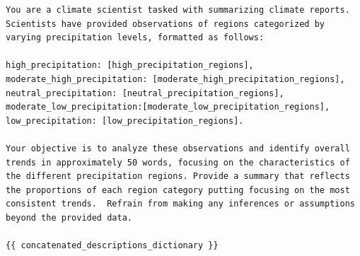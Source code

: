 \begin{tcolorbox}[title=PROMPT: Aggregate Summaries, width=\linewidth, colframe=navy]
    \begin{lstlisting}[basicstyle=\ttfamily\footnotesize,breaklines=true, columns=fullflexible,showstringspaces=false, keepspaces=true, belowskip=0pt, aboveskip=0pt,breakindent=0pt] 
You are a climate scientist tasked with summarizing climate reports. Scientists have provided observations of regions categorized by varying precipitation levels, formatted as follows:

high_precipitation: [high_precipitation_regions], moderate_high_precipitation: [moderate_high_precipitation_regions], neutral_precipitation: [neutral_precipitation_regions], moderate_low_precipitation:[moderate_low_precipitation_regions], low_precipitation: [low_precipitation_regions].

Your objective is to analyze these observations and identify overall trends in approximately 50 words, focusing on the characteristics of the different precipitation regions. Provide a summary that reflects the proportions of each region category putting focusing on the most consistent trends.  Refrain from making any inferences or assumptions beyond the provided data. 

{{ concatenated_descriptions_dictionary }}\end{lstlisting}
\end{tcolorbox}

